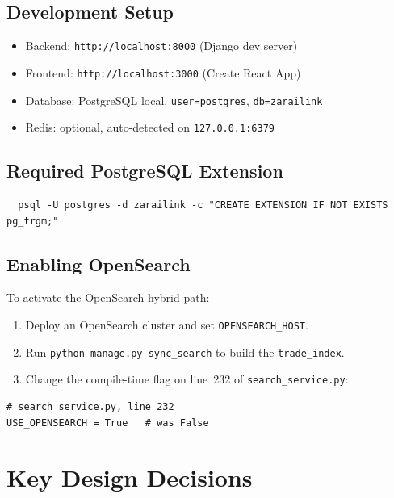 \documentclass[12pt,a4paper]{article}
\begin{document}
\subsection{Development Setup}

\begin{itemize}
  \item Backend: \texttt{http://localhost:8000} (Django dev server)
  \item Frontend: \texttt{http://localhost:3000} (Create React App)
  \item Database: PostgreSQL local, \texttt{user=postgres}, \texttt{db=zarailink}
  \item Redis: optional, auto-detected on \texttt{127.0.0.1:6379}
\end{itemize}

\subsection{Required PostgreSQL Extension}

\begin{verbatim}
  psql -U postgres -d zarailink -c "CREATE EXTENSION IF NOT EXISTS pg_trgm;"
\end{verbatim}

\subsection{Enabling OpenSearch}

To activate the OpenSearch hybrid path:
\begin{enumerate}
  \item Deploy an OpenSearch cluster and set \texttt{OPENSEARCH\_HOST}.
  \item Run \texttt{python manage.py sync\_search} to build the \texttt{trade\_index}.
  \item Change the compile-time flag on line~232 of \texttt{search\_service.py}:
\end{enumerate}

\begin{lstlisting}[caption={Enabling OpenSearch path}]
# search_service.py, line 232
USE_OPENSEARCH = True   # was False
\end{lstlisting}

\newpage
\section{Key Design Decisions}
\label{sec:decisions}
\end{document}
